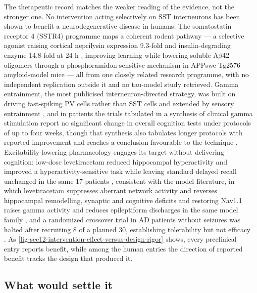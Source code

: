 \documentclass[11pt]{article}
\begin{document}
The therapeutic record matches the weaker reading of the evidence, not the stronger one. No intervention acting selectively on SST interneurons has been shown to benefit a neurodegenerative disease in humans. The somatostatin receptor 4 (SSTR4) programme maps a coherent rodent pathway --- a selective agonist raising cortical neprilysin expression 9.3-fold and insulin-degrading enzyme 14.8-fold at 24 h \citep{Sandoval2019}, improving learning while lowering soluble A$\beta$42 oligomers through a phosphoramidon-sensitive mechanism in APPswe Tg2576 amyloid-model mice \citep{Sandoval2013} --- all from one closely related research programme, with no independent replication outside it and no tau-model study retrieved. Gamma entrainment, the most publicised interneuron-directed strategy, was built on driving fast-spiking PV cells rather than SST cells \citep{Iaccarino2016} and extended by sensory entrainment \citep{Martorell2019}, and in patients the trials tabulated in a synthesis of clinical gamma stimulation report no significant change in overall cognition tests under protocols of up to four weeks, though that synthesis also tabulates longer protocols with reported improvement and reaches a conclusion favourable to the technique \citep{DePaolis2024}. Excitability-lowering pharmacology engages its target without delivering cognition: low-dose levetiracetam reduced hippocampal hyperactivity and improved a hyperactivity-sensitive task while leaving standard delayed recall unchanged in the same 17 patients \citep{Bakker2012}, consistent with the model literature, in which levetiracetam suppresses aberrant network activity and reverses hippocampal remodelling, synaptic and cognitive deficits \citep{Sanchez2012} and restoring Nav1.1 raises gamma activity and reduces epileptiform discharges in the same model family \citep{Verret2012}, and a randomized crossover trial in AD patients without seizures was halted after recruiting 8 of a planned 30, establishing tolerability but not efficacy \citep{Sen2024}. As \ref{fig-sec12-intervention-effect-versus-design-rigor} shows, every preclinical entry reports benefit, while among the human entries the direction of reported benefit tracks the design that produced it.

\subsection{What would settle it}
\label{sec-12-agenda}
\end{document}
